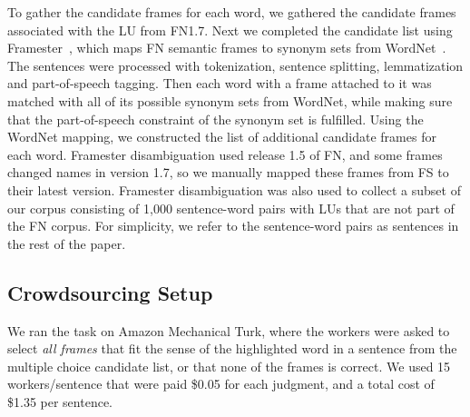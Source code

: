 To gather the candidate frames for each word, we gathered the candidate frames associated with the LU from FN1.7. Next we completed the candidate list using Framester~\cite{gangemi2016framester}, which maps FN semantic frames to synonym sets from WordNet~\cite{miller1995wordnet}. The sentences were processed with tokenization, sentence splitting, lemmatization and part-of-speech tagging. Then each word with a frame attached to it was matched with all of its possible synonym sets from WordNet, while making sure that the part-of-speech constraint of the synonym set is fulfilled. Using the WordNet mapping, we constructed the list of additional candidate frames for each word.  Framester disambiguation used release 1.5 of FN, and some frames changed names in version 1.7, so we manually mapped these frames from FS to their latest version. Framester disambiguation was also used to collect a subset of our corpus consisting of 1,000 sentence-word pairs with LUs that are not part of the FN corpus. For simplicity, we refer to the sentence-word pairs as sentences in the rest of the paper. 


\subsection{Crowdsourcing Setup}

We ran the task on Amazon Mechanical Turk, where the workers were asked to select \emph{all frames} that fit the sense of the highlighted word in a sentence from the multiple choice candidate list, or that none of the frames is correct. We used 15 workers/sentence that were paid \$0.05 for each judgment, and a total cost of \$1.35 per sentence.


